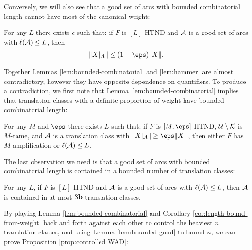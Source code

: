 \documentclass[12pt]{amsart}
\begin{document}
Conversely, we will also see that a good set of arcs with bounded combinatorial length cannot have most of the canonical weight:

\begin{lem}\label{lem:hammer}
	For any $L$ there exists $\epsilon$ such that: if $F$ is $[L]$-HTND and $\AA$ is a good set of arcs with $\ell(\AA)\leq L$, then $$\|X|_\AA\|\leq (1-\eps)\|\xhv\|.$$
\end{lem}

Together Lemmas \ref{lem:bounded-combinatorial} and \ref{lem:hammer} are almost contradictory, however they have opposite dependence on quantifiers. To produce a contradiction, we first note that Lemma \ref{lem:bounded-combinatorial} implies that  translation classes with a definite proportion of weight have bounded combinatorial length:

\begin{cor} \label{cor:length-bound-from-weight}
	For any $M$ and $\eps$ there exists $L$ such that: if  $F$ is $[M, \eps]$-HTND, $\UU\sm \KK$ is $M$-tame,  and $\AA$ is a translation class with $\|X|_\AA\|\geq \eps \|\xhv\|$, then either $F$ has $M$-amplification or  $\ell(\AA)\leq L$. 
\end{cor}


The last observation we need is that a good set of arcs with bounded combinatorial length is contained in a bounded number of translation classes:

\begin{lem}\label{lem:bounded good}
	For any $L$, if $F$ is $[L]$-HTND and $\AA$ is a good set of arcs with $\ell(\AA)\leq L$, then $\AA$ is contained in at most $3\bound$ translation classes.
\end{lem}

By playing Lemma \ref{lem:bounded-combinatorial} and Corollary \ref{cor:length-bound-from-weight} back and forth against each other to control the heaviest $n$ translation classes, and using Lemma \ref{lem:bounded good} to bound $n$, 
we can prove Proposition \ref{prop:controlled WAD}:
\end{document}
